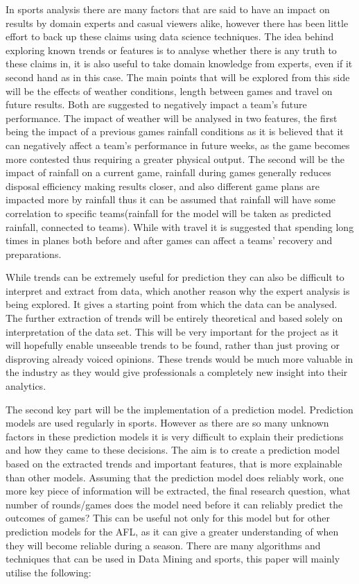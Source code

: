 \documentclass{imc-inf}
\begin{document}
	In sports analysis there are many factors that are said to have an impact on results by domain experts and casual viewers alike, however there has been little effort to back up these claims using data science techniques. The idea behind exploring known trends or features is to analyse whether there is any truth to these claims in, it is also useful to take domain knowledge from experts, even if it second hand as in this case. The main points that will be explored from this side will be the effects of weather conditions, length between games and travel on future results. Both are suggested to negatively impact a team’s future performance. The impact of weather will be analysed in two features, the first being the impact of a previous games rainfall conditions as it is believed that it can negatively affect a team’s performance in future weeks, as the game becomes more contested thus requiring a greater physical output. The second will be the impact of rainfall on a current game, rainfall during games generally reduces disposal efficiency making results closer, and also different game plans are impacted more by rainfall thus it can be assumed that rainfall will have some correlation to specific teams(rainfall for the model will be taken as predicted rainfall, connected to teams). While with travel it is suggested that spending long times in planes both before and after games can affect a teams’ recovery and preparations.\linebreak
	
	While trends can be extremely useful for prediction they can also be difficult to interpret and extract from data, which another reason why the expert analysis is being explored. It gives a starting point from which the data can be analysed. The further extraction of trends will be entirely theoretical and based solely on interpretation of the data set. This will be very important for the project as it will hopefully enable unseeable trends to be found, rather than just proving or disproving already voiced opinions. These trends would be much more valuable in the industry as they would give professionals a completely new insight into their analytics.
	
	The second key part will be the implementation of a prediction model. Prediction models are used regularly in sports. However as there are so many unknown factors in these prediction models it is very difficult to explain their predictions and how they came to these decisions. The aim is to create a prediction model based on the extracted trends and important features, that is more explainable than other models. 
	Assuming that the prediction model does reliably work, one more key piece of information will be extracted, the final research question, what number of rounds/games does the model need before it can reliably predict the outcomes of games? This can be useful not only for this model but for other prediction models for the AFL, as it can give a greater understanding of when they will become reliable during a season.
	There are many algorithms and techniques that can be used in Data Mining and sports, this paper will mainly utilise the following:
	
\end{document}
